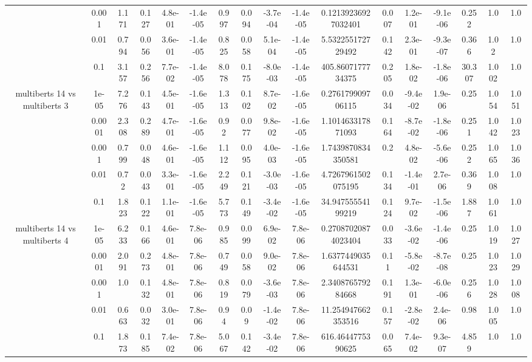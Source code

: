 \begin{tabular}{|c|c|c|c|c|c|c|c|c|c|c|c|c|c|c|c|c|}
 & 0.001 & 1.171 & 0.127 & 4.8e-01 & -1.4e-05 & 0.997 & 0.094 & -3.7e-04 & -1.4e-05 & 0.12139236927032401 & 0.007 & 1.2e-01 & -9.1e-06 & 0.252 & 1.0 & 1.0 \\
 & 0.01 & 0.794 & 0.056 & 3.6e-01 & -1.4e-05 & 0.825 & 0.058 & 5.1e-04 & -1.4e-05 & 5.532255172729492 & 0.142 & 2.3e-01 & -9.3e-07 & 0.366 & 1.02 & 1.0 \\
 & 0.1 & 3.157 & 0.256 & 7.7e-02 & -1.4e-05 & 8.078 & 0.175 & -8.0e-03 & -1.4e-05 & 405.8607177734375 & 0.205 & 1.8e-02 & -1.8e-06 & 30.307 & 1.002 & 1.0 \\
\hline
\multirow{5}{*}{multiberts 14 vs multiberts 3} & 1e-05 & 7.276 & 0.143 & 4.5e-01 & -1.6e-05 & 1.313 & 0.102 & 8.7e-02 & -1.6e-05 & 0.276179909706115 & 0.034 & -9.4e-02 & 1.9e-06 & 0.25 & 1.054 & 1.051 \\
 & 0.0001 & 2.308 & 0.289 & 4.7e-01 & -1.6e-05 & 0.92 & 0.077 & 9.8e-02 & -1.6e-05 & 1.101463317871093 & 0.164 & -8.7e-02 & -1.8e-06 & 0.251 & 1.042 & 1.023 \\
 & 0.001 & 0.799 & 0.048 & 4.6e-01 & -1.6e-05 & 1.112 & 0.095 & 4.0e-03 & -1.6e-05 & 1.7439870834350581 & 0.2 & 4.8e-02 & -5.6e-06 & 0.252 & 1.065 & 1.036 \\
 & 0.01 & 0.72 & 0.043 & 3.3e-01 & -1.6e-05 & 2.249 & 0.121 & -3.0e-03 & -1.6e-05 & 4.7267961502075195 & 0.134 & -1.4e-01 & 2.7e-06 & 0.369 & 1.008 & 1.0 \\
 & 0.1 & 1.823 & 0.122 & 1.1e-01 & -1.6e-05 & 5.773 & 0.149 & -3.4e-02 & -1.6e-05 & 34.94755554199219 & 0.124 & 9.7e-02 & -1.5e-06 & 1.887 & 1.061 & 1.0 \\
\hline
\multirow{5}{*}{multiberts 14 vs multiberts 4} & 1e-05 & 6.233 & 0.166 & 4.6e-01 & 7.8e-06 & 0.985 & 0.099 & 6.9e-02 & 7.8e-06 & 0.27087020874023404 & 0.033 & -3.6e-02 & -1.4e-06 & 0.25 & 1.019 & 1.027 \\
 & 0.0001 & 2.091 & 0.273 & 4.8e-01 & 7.8e-06 & 0.749 & 0.058 & 9.0e-02 & 7.8e-06 & 1.6377449035644531 & 0.11 & -5.8e-02 & -8.7e-08 & 0.25 & 1.023 & 1.029 \\
 & 0.001 & 1.0 & 0.132 & 4.8e-01 & 7.8e-06 & 0.819 & 0.079 & -3.6e-03 & 7.8e-06 & 2.340876579284668 & 0.191 & 1.3e-01 & -6.0e-06 & 0.256 & 1.028 & 1.008 \\
 & 0.01 & 0.663 & 0.032 & 3.0e-01 & 7.8e-06 & 0.94 & 0.09 & -1.4e-02 & 7.8e-06 & 11.254947662353516 & 0.157 & -2.8e-02 & 2.4e-06 & 0.98 & 1.005 & 1.0 \\
 & 0.1 & 1.873 & 0.185 & 7.4e-02 & 7.8e-06 & 5.067 & 0.142 & -3.4e-02 & 7.8e-06 & 616.4644775390625 & 0.065 & 7.4e-02 & 9.3e-07 & 4.859 & 1.0 & 1.0 \\

\end{tabular}
